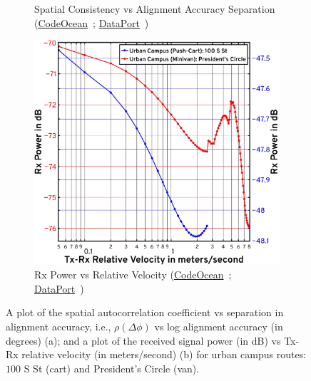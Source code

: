 \documentclass[10pt, twocolumn]{IEEEtran}
\begin{document}
{\begin{figure} [t]
\begin{subfigure}{0.4925\linewidth}
        \caption{Spatial Consistency vs Alignment Accuracy Separation (\href{https://codeocean.com/capsule/9545863/tree}{CodeOcean}~\cite{CodeOcean}; \href{http://ieee-dataport.org/12580}{DataPort}~\cite{DataPort})}
        \label{F8a}
    \end{subfigure}
    \begin{subfigure}{0.4975\linewidth}
        \centering
        \includegraphics[width=0.95\linewidth]{figs/rx_power_vs_velocity.pdf}
        \caption{Rx Power vs Relative Velocity (\href{https://codeocean.com/capsule/9545863/tree}{CodeOcean}~\cite{CodeOcean}; \href{http://ieee-dataport.org/12580}{DataPort}~\cite{DataPort})}
        \label{F8b}
    \end{subfigure}
    \vspace{-5mm}
    \caption{A plot of the spatial autocorrelation coefficient vs separation in alignment accuracy, i.e., $\rho(\Delta \phi)$ vs log alignment accuracy (in degrees) (a); and a plot of the received signal power (in dB) vs Tx-Rx relative velocity (in meters/second) (b) for urban campus routes: $100$ S St (cart) and President's Circle (van).}
    \vspace{-6mm}
    \label{F8}
\end{figure}
}
\end{document}
